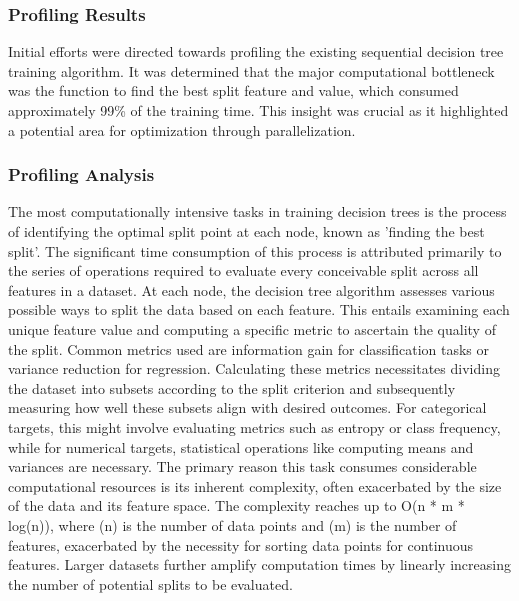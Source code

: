 \documentclass[13pt]{article}
\begin{document}
\subsubsection{Profiling Results}
Initial efforts were directed towards profiling the existing sequential decision tree training algorithm. It was determined that the major computational bottleneck was the function to find the best split feature and value, which consumed approximately 99\% of the training time. This insight was crucial as it highlighted a potential area for optimization through parallelization.

\subsubsection{Profiling Analysis}
The most computationally intensive tasks in training decision trees is the process of identifying the optimal split point at each node, known as 'finding the best split'. The significant time consumption of this process is attributed primarily to the series of operations required to evaluate every conceivable split across all features in a dataset.
\newline
\newline
At each node, the decision tree algorithm assesses various possible ways to split the data based on each feature. This entails examining each unique feature value and computing a specific metric to ascertain the quality of the split. Common metrics used are information gain for classification tasks or variance reduction for regression. Calculating these metrics necessitates dividing the dataset into subsets according to the split criterion and subsequently measuring how well these subsets align with desired outcomes. For categorical targets, this might involve evaluating metrics such as entropy or class frequency, while for numerical targets, statistical operations like computing means and variances are necessary.
\newline
\newline
The primary reason this task consumes considerable computational resources is its inherent complexity, often exacerbated by the size of the data and its feature space. The complexity reaches up to O(n * m * log(n)), where (n) is the number of data points and (m) is the number of features, exacerbated by the necessity for sorting data points for continuous features. Larger datasets further amplify computation times by linearly increasing the number of potential splits to be evaluated.
\newline
\end{document}

